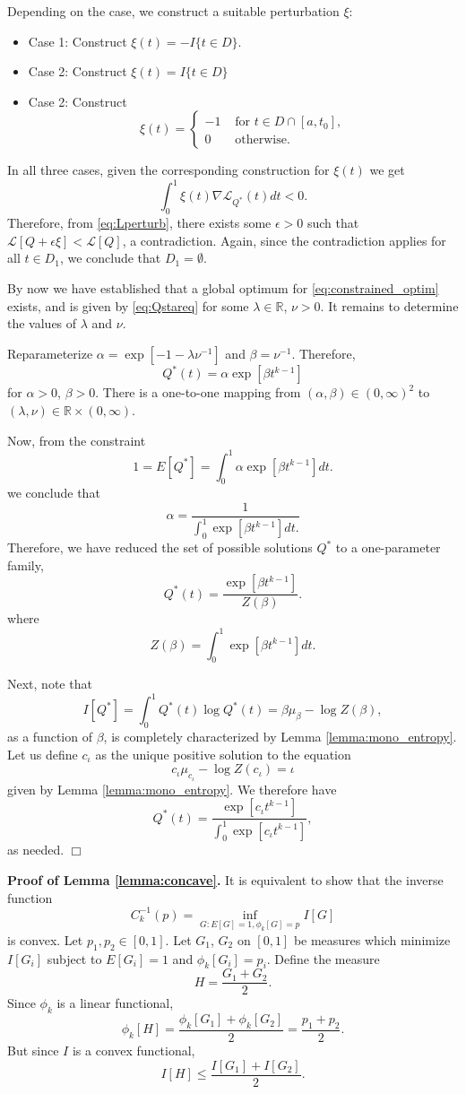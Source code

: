 \documentclass[12pt]{article}
\begin{document}
Depending on the case, we construct a suitable perturbation $\xi$:
\begin{itemize}
\item Case 1: Construct $\xi(t) = -I\{t \in D\}$.
\item Case 2: Construct $\xi(t) = I\{t \in D\}$
\item Case 2: Construct
\[
\xi(t) = \begin{cases}
-1 & \text{ for }t \in D \cap [a, t_0],\\
0 & \text{ otherwise. }
\end{cases}
\]
\end{itemize}
In all three cases, given the corresponding construction for $\xi(t)$ we get
\[
\int_0^1 \xi(t) \nabla \mathcal{L}_{Q^*}(t) dt < 0.
\]
Therefore, from \eqref{eq:Lperturb}, there exists some $\epsilon > 0$
such that $\mathcal{L}[Q + \epsilon \xi] < \mathcal{L}[Q]$, a
contradiction.  Again, since the contradiction applies for all $t \in
D_1$, we conclude that $D_1 = \emptyset$.

By now we have established that a global optimum
for \eqref{eq:constrained_optim} exists, and is given
by \eqref{eq:Qstareq} for some $\lambda \in \mathbb{R}$, $\nu > 0$.  It remains
to determine the values of $\lambda$ and $\nu$.

Reparameterize $\alpha = \exp[-1-\lambda\nu^{-1}]$ and $\beta = \nu^{-1}$.
Therefore,
\[
Q^*(t) = \alpha \exp[\beta t^{k-1}]
\]
for $\alpha > 0$, $\beta > 0$.  There is a one-to-one mapping from
$(\alpha, \beta) \in (0, \infty)^2$ to $(\lambda, \nu) \in
\mathbb{R} \times (0,\infty)$.

Now, from the constraint
\[
1 = E[Q^*] = \int_0^1 \alpha \exp[\beta t^{k-1}] dt.
\]
we conclude that
\[
\alpha = \frac{1}{\int_0^1 \exp[\beta t^{k-1}] dt.}
\]
Therefore, we have reduced the set of possible solutions $Q^*$ to a one-parameter family,
\[
Q^*(t) = \frac{\exp[\beta t^{k-1}]}{Z(\beta)}.
\]
where
\[
Z(\beta) = \int_0^1 \exp[\beta t^{k-1}] dt.
\]

Next, note that
\[
I[Q^*] = \int_0^1 Q^*(t) \log Q^*(t) = \beta \mu_\beta - \log Z(\beta),
\]
as a function of $\beta$, is completely characterized by Lemma \ref{lemma:mono_entropy}.
Let us define $c_\iota$ as the unique positive solution to the equation
\[
c_\iota \mu_{c_\iota} - \log Z(c_\iota) = \iota
\]
given by Lemma \ref{lemma:mono_entropy}.
We therefore have
\[
Q^*(t) = \frac{\exp[c_\iota t^{k-1}]}{\int_0^1 \exp[c_\iota t^{k-1}]},
\]
as needed. $\Box$

\textbf{Proof of Lemma \ref{lemma:concave}.}
It is equivalent to show that the inverse function
\[
C^{-1}_k(p) = \inf_{G: E[G] = 1, \phi_k[G] = p} I[G]
\]
is convex.  Let $p_1, p_2 \in [0,1]$.  Let $G_1$, $G_2$ on $[0,1]$ be
measures which minimize $I[G_i]$ subject to $E[G_i] = 1$ and
$\phi_k[G_i] = p_i$.  Define the measure
\[
H = \frac{G_1 + G_2}{2}.
\]
Since $\phi_k$ is a linear functional,
\[
\phi_k[H] = \frac{\phi_k[G_1] + \phi_k[G_2]}{2} = \frac{p_1 + p_2}{2}.
\]
But since $I$ is a convex functional,
\[
I[H] \leq \frac{I[G_1] + I[G_2]}{2}.
\]
\end{document}
